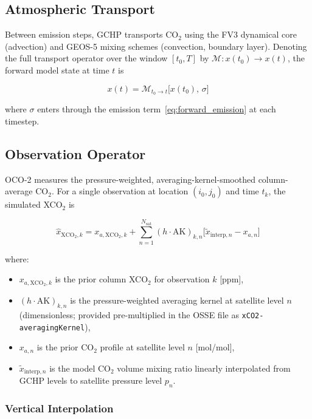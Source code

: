 \documentclass[12pt]{article}
\begin{document}
\subsection{Atmospheric Transport}

Between emission steps, GCHP transports CO$_2$ using the FV3 dynamical core
(advection) and GEOS-5 mixing schemes (convection, boundary layer). Denoting the
full transport operator over the window $[t_0, T]$ by
$\mathcal{M}: x(t_0) \to x(t)$, the forward model state at time $t$ is

\begin{equation}
  x(t) = \mathcal{M}_{t_0 \to t}\bigl[x(t_0),\,\sigma\bigr]
\end{equation}

where $\sigma$ enters through the emission term~\eqref{eq:forward_emission} at
each timestep.

\subsection{Observation Operator}
\label{sec:obs_operator}

OCO-2 measures the pressure-weighted, averaging-kernel-smoothed column-average
CO$_2$. For a single observation at location $(i_0, j_0)$ and time $t_k$,
the simulated XCO$_2$ is

\begin{equation}
  \hat{x}_{\mathrm{XCO}_2,k}
  = x_{a,\mathrm{XCO}_2,k}
  + \sum_{n=1}^{N_{\mathrm{sat}}} (h \cdot \mathrm{AK})_{k,n}
    \bigl[\tilde{x}_{\mathrm{interp},n} - x_{a,n}\bigr]
  \label{eq:obs_operator}
\end{equation}

where:
\begin{itemize}
  \item $x_{a,\mathrm{XCO}_2,k}$ is the prior column XCO$_2$ for observation $k$ [ppm],
  \item $(h \cdot \mathrm{AK})_{k,n}$ is the pressure-weighted averaging kernel
        at satellite level $n$ (dimensionless; provided pre-multiplied in the
        OSSE file as \texttt{xCO2-averagingKernel}),
  \item $x_{a,n}$ is the prior CO$_2$ profile at satellite level $n$ [mol/mol],
  \item $\tilde{x}_{\mathrm{interp},n}$ is the model CO$_2$ volume mixing ratio
        linearly interpolated from GCHP levels to satellite pressure level $p_n$.
\end{itemize}

\subsubsection{Vertical Interpolation}
\end{document}
